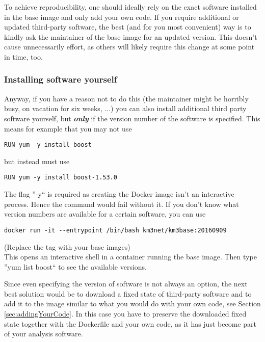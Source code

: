 \documentclass[a4paper, twoside, 11pt]{article}
\begin{document}
To achieve reproducibility, one should ideally rely on the exact software installed in the base image and only add your own code. 
If you require additional or updated third-party software, the best (and for you most convenient) way 
is to kindly ask the maintainer of the base image for an updated version. 
This doesn't cause unnecessarily effort, 
as others will likely require this change at some point in time, too. 

\subsubsection{Installing software yourself}
Anyway, if you have a reason not to do this (the maintainer might be horribly busy, on vacation for six weeks, ...) 
you can also install additional third party software yourself, 
but \textbf{\textit{only}} if the version number of the software is specified. 
This means for example that you may not use 
\begin{lstlisting}[basicstyle=\ttfamily\small,upquote=true,columns=flexible,keepspaces=true,frame=single]
RUN yum -y install boost 
\end{lstlisting}
but instead must use 
\begin{lstlisting}[basicstyle=\ttfamily\small,upquote=true,columns=flexible,keepspaces=true,frame=single]
RUN yum -y install boost-1.53.0
\end{lstlisting}
The flag ''-y`` is required as creating the Docker image isn't an interactive process. 
Hence the command would fail without it. 
If you don't know what version numbers are available for a certain software, you can use 
\begin{lstlisting}[basicstyle=\ttfamily\small,upquote=true,columns=flexible,keepspaces=true,frame=single]
docker run -it --entrypoint /bin/bash km3net/km3base:20160909
\end{lstlisting}
(Replace the tag with your base images) \\
This opens an interactive shell in a container running the base image. 
Then type ''yum list boost`` to see the available versions. 

Since even specifying the version of software is not always an option, 
the next best solution would be to download a fixed state of third-party software 
and to add it to the image similar to what you would do with your own code, 
see Section \ref{sec:addingYourCode}. 
In this case you have to preserve the downloaded fixed state together with the Dockerfile and your own code, 
as it has just become part of your analysis software. 
\end{document}
